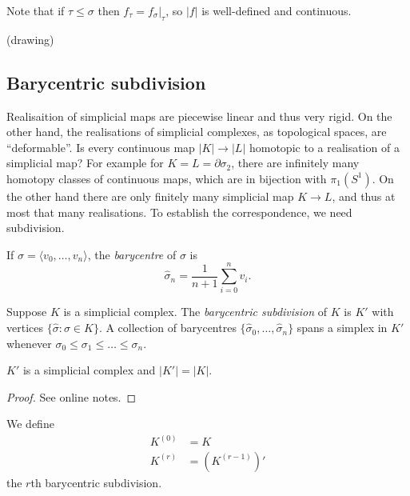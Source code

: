 \documentclass[a4paper]{article}
\renewcommand{\b}{\partial} %
\begin{document}
Note that if \(\tau \leq \sigma\) then \(f_\tau = f_\sigma|_\tau\), so \(|f|\) is well-defined and continuous.
\begin{eg}
  (drawing)
\end{eg}

\subsection{Barycentric subdivision}

Realisaition of simplicial maps are piecewise linear and thus very rigid. On the other hand, the realisations of simplicial complexes, as topological spaces, are ``deformable''. Is every continuous map \(|K| \to |L|\) homotopic to a realisation of a simplicial map? For example for \(K = L = \b \sigma_2\), there are infinitely many homotopy classes of continuous maps, which are in bijection with \(\pi_1(S^1)\). On the other hand there are only finitely many simplicial map \(K \to L\), and thus at most that many realisations. To establish the correspondence, we need subdivision.

\begin{definition}[barycentre]
  If \(\sigma = \langle v_0, \dots, v_n \rangle\), the \emph{barycentre} of \(\sigma\) is
  \[
    \hat \sigma_n = \frac{1}{n + 1} \sum_{i = 0}^n v_i.
  \]
\end{definition}

\begin{definition}
  Suppose \(K\) is a simplicial complex. The \emph{barycentric subdivision} of \(K\) is \(K'\) with vertices \(\{\hat \sigma: \sigma \in K\}\). A collection of barycentres \(\{\hat \sigma_0, \dots, \hat \sigma_n\}\) spans a simplex in \(K'\) whenever \(\sigma_0 \leq \sigma_1 \leq \dots \leq \sigma_n\).
\end{definition}

\begin{lemma}
  \(K'\) is a simplicial complex and \(|K'| = |K|\).
\end{lemma}

\begin{proof}
  See online notes.
\end{proof}

\begin{definition}
  We define
  \begin{align*}
    K^{(0)} &= K \\
    K^{(r)} &= (K^{(r - 1)})'
  \end{align*}
  the \(r\)th barycentric subdivision.
\end{definition}
\end{document}
